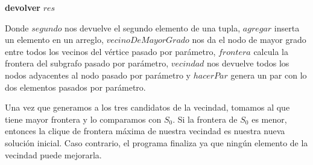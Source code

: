\begin{itemize}
\begin{algorithm}[H]

    \textbf{devolver} $res$ \\
\end{algorithm}
Donde $segundo$ nos devuelve el segundo elemento de una tupla,  $agregar$ inserta un elemento en un arreglo, $vecinoDeMayorGrado$ nos da el nodo de mayor grado entre todos los vecinos del vértice pasado por parámetro, $frontera$ calcula la frontera del subgrafo pasado por parámetro, $vecindad$ nos devuelve todos los nodos adyacentes al nodo pasado por parámetro y $hacerPar$ genera un par con lo dos elementos pasados por parámetro. \newline
\end{itemize}

Una vez que generamos a los tres candidatos de la vecindad, tomamos al que tiene mayor frontera y lo comparamos con $S_{0}$. Si la frontera de $S_{0}$ es menor, entonces la clique de frontera máxima de nuestra vecindad es nuestra nueva solución inicial. Caso contrario, el programa finaliza ya que ningún elemento de la vecindad puede mejorarla.

